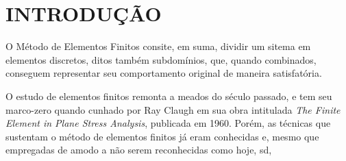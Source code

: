 

\chapter{INTRODUÇÃO}

O Método de Elementos Finitos consite, em suma, dividir um sitema em elementos discretos, ditos também subdomínios, que, quando combinados, conseguem representar seu comportamento original de maneira satisfatória. \cite{Bittencourt}

O estudo de elementos finitos remonta a meados do século passado, e tem seu marco-zero quando cunhado por Ray Claugh em sua obra intitulada \textit{The Finite Element in Plane Stress Analysis}, publicada em 1960. Porém, as técnicas que sustentam o método de elementos finitos já eram conhecidas e, mesmo que empregadas de amodo a não serem reconhecidas como hoje, sd,  \cite{Azevedo}